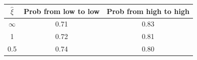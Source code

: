 \begin{tabular}{ccc}
\hline
\rule{0pt}{1.2em}
$\widehat \xi$  &Prob from low to low& Prob from high to high \\
\hline
$\infty$ &  0.71 & 0.83 \\
1 &  0.72 & 0.81 \\
0.5 &  0.74 & 0.80 \\


\hline
\end{tabular}
